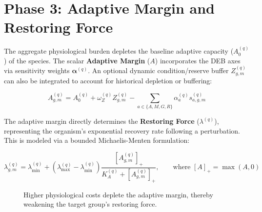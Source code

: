 \documentclass[11pt,a4paper]{article}
\begin{document}
\section{Phase 3: Adaptive Margin and Restoring Force}

The aggregate physiological burden depletes the baseline adaptive capacity ($A_0^{(q)}$) of the species. The scalar \textbf{Adaptive Margin} ($A$) incorporates the DEB axes via sensitivity weights $\bm{\alpha}^{(q)}$. An optional dynamic condition/reserve buffer $Z_{g,m}^{(q)}$ can also be integrated to account for historical depletion or buffering:

\begin{equation}
A_{g,m}^{(q)} = A_0^{(q)} + \omega_Z^{(q)} Z_{g,m}^{(q)} - \sum_{a \in \{A,M,G,R\}} \alpha_a^{(q)} s_{a,g,m}^{(q)}
\end{equation}

The adaptive margin directly determines the \textbf{Restoring Force} ($\lambda^{(q)}$), representing the organism's exponential recovery rate following a perturbation. This is modeled via a bounded Michaelis-Menten formulation:

\begin{equation}
\lambda_{g,m}^{(q)} = \lambda_{\min}^{(q)} + \left(\lambda_{\max}^{(q)} - \lambda_{\min}^{(q)}\right) \frac{\left[A_{g,m}^{(q)}\right]_+}{K_A^{(q)} + \left[A_{g,m}^{(q)}\right]_+}, \qquad \text{where } [A]_+=\max(A,0)
\end{equation}

\begin{figure}[H]
\centering
\begin{subfigure}{0.45\textwidth}
\centering
{}
\end{subfigure}
\hfill
\begin{subfigure}{0.45\textwidth}
\centering
{}
\end{subfigure}
\caption{Higher physiological costs deplete the adaptive margin, thereby weakening the target group's restoring force.}
\end{figure}
\end{document}
